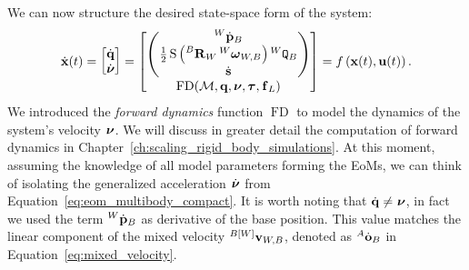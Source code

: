 We can now structure the desired state-space form of the system: 
%
\begin{equation}
    \label{equation:floatig_base_dynamics_state_space}
    \dot{\mathbf{x}}(t) =
    \begin{bmatrix}
        \dot{\mathbf{q}} \\ \dot{\boldsymbol{\nu}}
    \end{bmatrix} =
    \begin{bmatrix}
        \begin{pmatrix}
            \posd[W]_B \\
            \frac{1}{2} \operatorname{S}\left( \rot[B]_W \velang[W]_{W,B} \right) \quat[W]_B \\
            \dot{\mathbf{s}}
        \end{pmatrix}
        \\
        \operatorname{FD}(\mathcal{M}, \mathbf{q}, \boldsymbol{\nu}, \boldsymbol{\tau}, \forcesix_L)
    \end{bmatrix} =
    f\left(\mathbf{x}(t), \mathbf{u}(t)\right)
    .
\end{equation}
%
We introduced the \emph{forward dynamics} function $\operatorname{FD}$ to model the dynamics of the system's velocity $\Nu$.
We will discuss in greater detail the computation of forward dynamics in Chapter~\ref{ch:scaling_rigid_body_simulations}.
At this moment, assuming the knowledge of all model parameters forming the \acp{EoM}, we can think of isolating the generalized acceleration $\Nud$ from Equation~\eqref{eq:eom_multibody_compact}.
It is worth noting that $\Qud \neq \Nu$, in fact we used the term $\posd[W]_B$ as derivative of the base position.
This value matches the linear component of the mixed velocity $\velsix[{B[W]}]_{W,B}$, denoted as $\orid[A]_B$ in Equation~\eqref{eq:mixed_velocity}.


